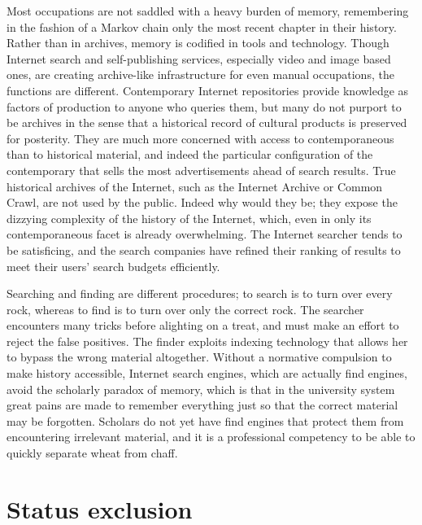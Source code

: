 \documentclass[]{book}
\theoremstyle{definition}
\theoremstyle{definition}
\theoremstyle{definition}
\theoremstyle{remark}
\begin{document}
Most occupations are not saddled with a heavy burden of memory,
remembering in the fashion of a Markov chain only the most recent
chapter in their history. Rather than in archives, memory is codified in
tools and technology. Though Internet search and self-publishing
services, especially video and image based ones, are creating
archive-like infrastructure for even manual occupations, the functions
are different. Contemporary Internet repositories provide knowledge as
factors of production to anyone who queries them, but many do not
purport to be archives in the sense that a historical record of cultural
products is preserved for posterity. They are much more concerned with
access to contemporaneous than to historical material, and indeed the
particular configuration of the contemporary that sells the most
advertisements ahead of search results. True historical archives of the
Internet, such as the Internet Archive or Common Crawl, are not used by
the public. Indeed why would they be; they expose the dizzying
complexity of the history of the Internet, which, even in only its
contemporaneous facet is already overwhelming. The Internet searcher
tends to be satisficing, and the search companies have refined their
ranking of results to meet their users' search budgets efficiently.

Searching and finding are different procedures; to search is to turn
over every rock, whereas to find is to turn over only the correct rock.
The searcher encounters many tricks before alighting on a treat, and
must make an effort to reject the false positives. The finder exploits
indexing technology that allows her to bypass the wrong material
altogether. Without a normative compulsion to make history accessible,
Internet search engines, which are actually find engines, avoid the
scholarly paradox of memory, which is that in the university system
great pains are made to remember everything just so that the correct
material may be forgotten. Scholars do not yet have find engines that
protect them from encountering irrelevant material, and it is a
professional competency to be able to quickly separate wheat from chaff.

\hypertarget{status-exclusion}{%
\section{Status exclusion}\label{status-exclusion}}
\end{document}

